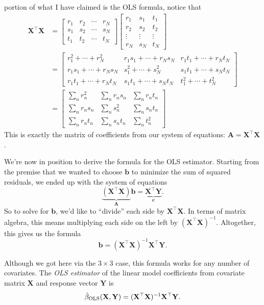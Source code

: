 \documentclass[12pt,oneside,openany]{book}
\begin{document}
portion of what I have claimed is the OLS formula, notice that \[
\begin{aligned}
\mathbf{X}^\top \mathbf{X}
&= \begin{bmatrix}
r_1 & r_2 & \cdots & r_N \\
s_1 & s_2 & \cdots & s_N \\
t_1 & t_2 & \cdots & t_N
\end{bmatrix} \begin{bmatrix}
r_1 & s_1 & t_1 \\
r_2 & s_2 & t_2 \\
\vdots & \vdots & \vdots \\
r_N & s_N & t_N
\end{bmatrix} \\
&= \begin{bmatrix}
r_1^2 + \cdots + r_N^2 & r_1 s_1 + \cdots + r_N s_N & r_1 t_1 + \cdots + r_N t_N \\
r_1 s_1 + \cdots + r_N s_N & s_1^2 + \cdots + s_N^2 & s_1 t_1 + \cdots + s_N t_N \\
r_1 t_1 + \cdots + r_N t_N & s_1 t_1 + \cdots + s_N t_N & t_1^2 + \cdots + t_N^2
\end{bmatrix} \\
&= \begin{bmatrix}
\sum_n r_n^2 & \sum_n r_n s_n & \sum_n r_n t_n \\
\sum_n r_n s_n & \sum_n s_n^2 & \sum_n s_n t_n \\
\sum_n r_n t_n & \sum_n s_n t_n & \sum_n t_n^2
\end{bmatrix}
\end{aligned}
\] This is exactly the matrix of coefficients from our system of
equations: \(\mathbf{A} = \mathbf{X}^\top \mathbf{X}\).

We're now in position to derive the formula for the OLS estimator.
Starting from the premise that we wanted to choose \(\mathbf{b}\) to
minimize the sum of squared residuals, we ended up with the system of
equations \[
\underbrace{(\mathbf{X}^\top \mathbf{X})}_{\mathbf{A}} \mathbf{b} = \underbrace{\mathbf{X}^\top \mathbf{Y}}_{\mathbf{c}}.
\] So to solve for \(\mathbf{b}\), we'd like to ``divide'' each side by
\(\mathbf{X}^\top \mathbf{X}\). In terms of matrix algebra, this means
multiplying each side on the left by
\((\mathbf{X}^\top \mathbf{X})^{-1}\). Altogether, this gives us the
formula \[
\mathbf{b} = (\mathbf{X}^\top \mathbf{X})^{-1} \mathbf{X}^\top \mathbf{Y}.
\]

Although we got here via the \(3 \times 3\) case, this formula works for
any number of covariates. The \emph{OLS estimator} of the linear model
coefficients from covariate matrix \(\mathbf{X}\) and response vector
\(\mathbf{Y}\) is \[
\hat{\beta}_{\text{OLS}}(\mathbf{X}, \mathbf{Y})
= (\mathbf{X}^\top \mathbf{X})^{-1} \mathbf{X}^\top \mathbf{Y}.
\]
\end{document}
